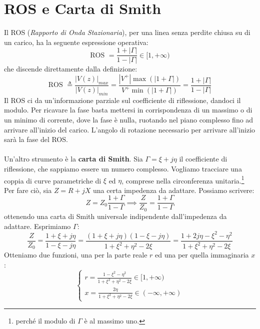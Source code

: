 \documentclass{book}
\begin{document}
    \section*{ROS e Carta di Smith}
        Il ROS (\textit{Rapporto di Onda Stazionaria}), per una linea senza perdite chiusa su di un carico, ha la seguente espressione operativa:
        \begin{equation}
            \textrm{ROS } = \frac{1+|\Gamma|}{1-|\Gamma|} \in [1, + \infty)
        \end{equation}
        che discende direttamente dalla definizione:
        \begin{equation}
            \textrm{ROS } \triangleq  \frac{|V(z)|_{max}}{|V(z)|_{min}} = \frac{|V^{+}|\max(|1+\Gamma|)}{V^{+}\min(|1+\Gamma|)} = \frac{1+|\Gamma|}{1-|\Gamma|} 
        \end{equation}
        Il ROS ci da un'informazione parziale sul coefficiente di riflessione, dandoci il modulo. Per ricavare la fase basta mettersi in corrispondenza di un massimo o di un minimo
        di corrente, dove la fase è nulla, ruotando nel piano complesso fino ad arrivare all'inizio del carico. L'angolo di rotazione necessario per arrivare all'inizio sarà la fase del ROS.
        \\ \\ 
        Un'altro strumento è la \textbf{carta di Smith}. Sia $\Gamma = \xi +j \eta$ il coefficiente di riflessione, che sappiamo essere un numero complesso.
        Vogliamo tracciare una coppia di curve parametriche di $\xi$ ed $\eta$, comprese nella circonferenza unitaria.\footnote{perché il modulo di $\Gamma$ è al massimo uno.} \\
        Per fare ciò, sia $Z=R+jX$ una certa impedenza da adattare. Possiamo scrivere:
        \begin{equation}
            Z=Z_{0}\frac{1+\Gamma}{1-\Gamma} \implies \frac{Z}{Z_{0}} =\frac{1+\Gamma}{1-\Gamma}
        \end{equation}
        ottenendo una carta di Smith universale indipendente dall'impedenza da adattare. Esprimiamo $\Gamma$:
        \begin{equation}
            \frac{Z}{Z_{0}}=\frac{1+\xi+j\eta}{1-\xi-j\eta} = \frac{(1+\xi+j\eta)(1-\xi-j\eta)}{1+\xi ^{2}+\eta ^{2}-2\xi} = \frac{1+2j\eta - \xi ^{2} -\eta ^{2}}{1+\xi ^{2} + \eta ^{2}- 2 \xi}
        \end{equation}
        Otteniamo due funzioni, una per la parte reale  $r$ ed una per quella immaginaria $x$:
        \begin{equation}
            \begin{cases}
                \displaystyle r = \frac{1-\xi ^{2}-\eta ^{2}}{1+\xi ^{2}+\eta ^{2}-2\xi} \in [1, +\infty) \\
                \displaystyle x = \frac{2 \eta}{1+\xi ^{2}+\eta ^{2}-2\xi} \in (-\infty, + \infty)
            \end{cases}
        \end{equation}
\end{document}
